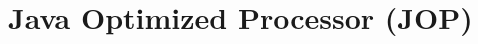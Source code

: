 \chapter{Java Optimized Processor (JOP)}
\label{chapter:jop}

\cite{JOPDesign} \cite{Schoeberl_ajava} \cite{jop:handbook}
